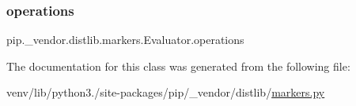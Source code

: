 \subsubsection{\texorpdfstring{operations}{operations}}
{\footnotesize\ttfamily pip.\+\_\+vendor.\+distlib.\+markers.\+Evaluator.\+operations\hspace{0.3cm}{\ttfamily [static]}}



The documentation for this class was generated from the following file\+:\begin{DoxyCompactItemize}
\item 
venv/lib/python3./site-\/packages/pip/\+\_\+vendor/distlib/\hyperlink{pip_2__vendor_2distlib_2markers_8py}{markers.\+py}\end{DoxyCompactItemize}
